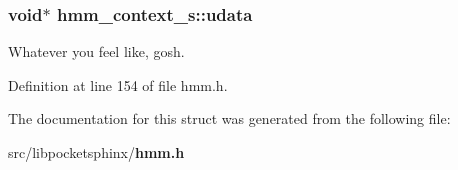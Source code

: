 \subsubsection[{udata}]{\setlength{\rightskip}{0pt plus 5cm}void$\ast$ hmm\+\_\+context\+\_\+s\+::udata}\label{structhmm__context__s_a1f80af93746230d41b4ee7e89786a4c7}


Whatever you feel like, gosh. 



Definition at line 154 of file hmm.\+h.



The documentation for this struct was generated from the following file\+:\begin{DoxyCompactItemize}
\item 
src/libpocketsphinx/{\bf hmm.\+h}\end{DoxyCompactItemize}
